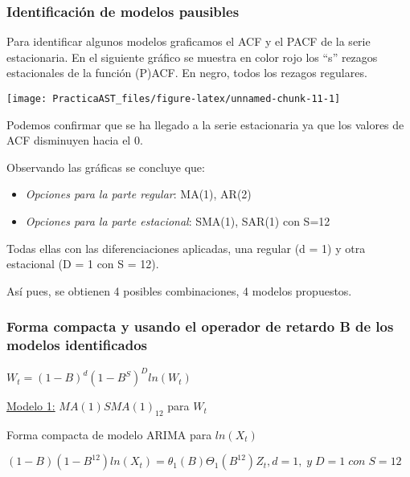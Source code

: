 \documentclass[
]{article}
\begin{document}
\hypertarget{identificaciuxf3n-de-modelos-pausibles}{%
\subsubsection{Identificación de modelos
pausibles}\label{identificaciuxf3n-de-modelos-pausibles}}

Para identificar algunos modelos graficamos el ACF y el PACF de la serie
estacionaria. En el siguiente gráfico se muestra en color rojo los ``s''
rezagos estacionales de la función (P)ACF. En negro, todos los rezagos
regulares.

\begin{center}\texttt{[image: PracticaAST\_files/figure-latex/unnamed-chunk-11-1]} \end{center}

Podemos confirmar que se ha llegado a la serie estacionaria ya que los
valores de ACF disminuyen hacia el 0.

Observando las gráficas se concluye que:

\begin{itemize}
\item
  \emph{Opciones para la parte regular}: MA(1), AR(2)
\item
  \emph{Opciones para la parte estacional}: SMA(1), SAR(1) con S=12
\end{itemize}

Todas ellas con las diferenciaciones aplicadas, una regular (d = 1) y
otra estacional (D = 1 con S = 12).

Así pues, se obtienen 4 posibles combinaciones, 4 modelos propuestos.

\pagebreak

\hypertarget{forma-compacta-y-usando-el-operador-de-retardo-b-de-los-modelos-identificados}{%
\subsubsection{Forma compacta y usando el operador de retardo B de los
modelos
identificados}\label{forma-compacta-y-usando-el-operador-de-retardo-b-de-los-modelos-identificados}}

\(W_t = (1-B)^d(1-B^S)^D ln(W_t)\)

\medskip

\underline{Modelo 1:} \(MA(1)SMA(1)_{12}\) para \(W_t\)

Forma compacta de modelo ARIMA para \(ln(X_t)\)

\((1-B)(1-B^{12}) ln(X_t) = \theta_1(B)\Theta_1(B^{12})Z_t, d = 1,\; y \; D = 1 \; con \; S = 12\)
\end{document}
